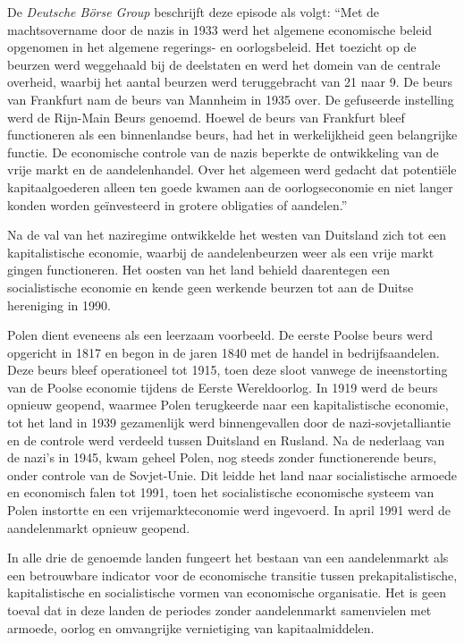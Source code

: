 De \emph{Deutsche Börse Group} beschrijft deze episode als volgt: ``Met de machtsovername door de nazi\textquotesingle s in 1933 werd het algemene economische beleid opgenomen in het algemene regerings- en oorlogsbeleid. Het toezicht op de beurzen werd weggehaald bij de deelstaten en werd het domein van de centrale overheid, waarbij het aantal beurzen werd teruggebracht van 21 naar 9. De beurs van Frankfurt nam de beurs van Mannheim in 1935 over. De gefuseerde instelling werd de Rijn-Main Beurs genoemd. Hoewel de beurs van Frankfurt bleef functioneren als een \textquotesingle binnenlandse beurs\textquotesingle, had het in werkelijkheid geen belangrijke functie. De economische controle van de nazi\textquotesingle s beperkte de ontwikkeling van de vrije markt en de aandelenhandel. Over het algemeen werd gedacht dat potentiële kapitaalgoederen alleen ten goede kwamen aan de oorlogseconomie en niet langer konden worden geïnvesteerd in grotere obligaties of aandelen.''\autocite{132}

Na de val van het naziregime ontwikkelde het westen van Duitsland zich tot een kapitalistische economie, waarbij de aandelenbeurzen weer als een vrije markt gingen functioneren. Het oosten van het land behield daarentegen een socialistische economie en kende geen werkende beurzen tot aan de Duitse hereniging in 1990.

Polen dient eveneens als een leerzaam voorbeeld. De eerste Poolse beurs werd opgericht in 1817 en begon in de jaren 1840 met de handel in bedrijfsaandelen. Deze beurs bleef operationeel tot 1915, toen deze sloot vanwege de ineenstorting van de Poolse economie tijdens de Eerste Wereldoorlog. In 1919 werd de beurs opnieuw geopend, waarmee Polen terugkeerde naar een kapitalistische economie, tot het land in 1939 gezamenlijk werd binnengevallen door de nazi-sovjetalliantie en de controle werd verdeeld tussen Duitsland en Rusland. Na de nederlaag van de nazi's in 1945, kwam geheel Polen, nog steeds zonder functionerende beurs, onder controle van de Sovjet-Unie. Dit leidde het land naar socialistische armoede en economisch falen tot 1991, toen het socialistische economische systeem van Polen instortte en een vrijemarkteconomie werd ingevoerd. In april 1991 werd de aandelenmarkt opnieuw geopend.\autocite{133}

In alle drie de genoemde landen fungeert het bestaan van een aandelenmarkt als een betrouwbare indicator voor de economische transitie tussen pre\-ka\-pi\-ta\-lis\-tis\-che, kapitalistische en socialistische vormen van economische organisatie. Het is geen toeval dat in deze landen de periodes zonder aandelenmarkt samenvielen met armoede, oorlog en omvangrijke vernietiging van kapitaalmiddelen.


